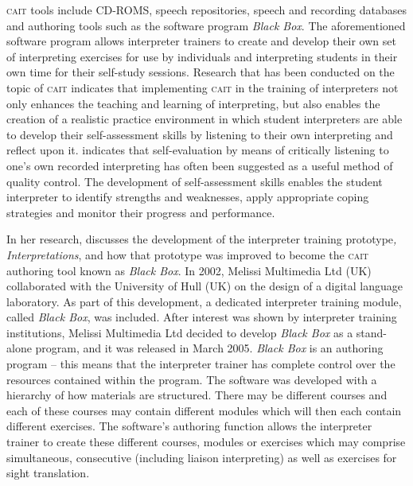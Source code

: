 \documentclass[output=paper]{langsci/langscibook}
\begin{document}
\textsc{cait} tools include \textsc{CD-ROMS}, speech repositories, speech and recording databases and authoring tools such as the software program \textit{Black Box}. The aforementioned software program allows interpreter trainers to create and develop their own set of interpreting exercises for use by individuals and interpreting students in their own time for their self-study sessions. Research that has been conducted on the topic of \textsc{cait} \citep{Sandrelli2007a,Pinazo2008,Lim2014} indicates that implementing \textsc{cait} in the training of interpreters not only enhances the teaching and learning of interpreting, but also enables the creation of a realistic practice environment in which student interpreters are able to develop their self-assessment skills by listening to their own interpreting and reflect upon it. \citet[252]{Bartlomiejczyk2007} indicates that self-evaluation by means of critically listening to one’s own recorded interpreting has often been suggested as a useful method of quality control. The development of self-assessment skills enables the student interpreter to identify strengths and weaknesses, apply appropriate coping strategies and monitor their progress and performance.

In her research, \citet{Sandrelli2007b} discusses the development of the interpreter training prototype\textit{, Interpretations}, and how that prototype was improved to become the \textsc{cait} authoring tool known as \textit{Black Box}. In 2002, Melissi Multimedia Ltd (UK) collaborated with the University of Hull (UK) on the design of a digital language laboratory. As part of this development, a dedicated interpreter training module, called \textit{Black Box}, was included. After interest was shown by interpreter training institutions, Melissi Multimedia Ltd decided to develop \textit{Black Box} as a stand-alone program, and it was released in March 2005. \textit{Black Box} is an authoring program – this means that the interpreter trainer has complete control over the resources contained within the program. The software was developed with a hierarchy of how materials are structured. There may be different courses and each of these courses may contain different modules which will then each contain different exercises. The software’s authoring function allows the interpreter trainer to create these different courses, modules or exercises which may comprise simultaneous, consecutive (including liaison interpreting) as well as exercises for sight translation. 
\end{document}
